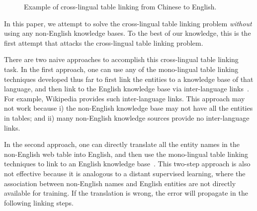 \begin{figure}[th]
\centering
{}
\caption{Example of cross-lingual table linking from Chinese to English.}
\label{fig:chinesetable}
\end{figure}

In this paper, we attempt to solve the cross-lingual table linking problem
{\em without} using any non-English knowledge bases.
To the best of our knowledge, this is the first attempt that attacks the 
cross-lingual table linking problem. 


There are two naive approaches to accomplish this cross-lingual table linking task.
In the first approach, one can use any of the mono-lingual table linking techniques developed thus far
to first link the entities to a knowledge base of that language, and then link to
the English knowledge base via inter-language links~\cite{tsai2016cross}.
For example, Wikipedia provides such inter-language links. 
This approach may not work because i) the non-English knowledge base 
may not have all the entities in tables; and ii)
many non-English knowledge sources provide no inter-language links. 

In the second approach, one can directly translate all the entity names in
the non-English web table into English,
and then use the mono-lingual table linking techniques to link to 
an English knowledge base~\cite{mcnamee2011cross}.
This two-step approach is also not effective because
it is analogous to a distant supervised learning,
where the association between non-English names and English entities are not directly available for training.
If the translation is wrong, the error will propagate in the following linking steps.




